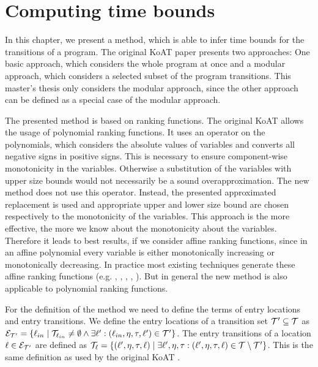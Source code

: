 \section{Computing time bounds}

In this chapter, we present a method, which is able to infer time bounds for the transitions of a program.
The original KoAT paper \cite{koat} presents two approaches: One basic approach, which considers the whole program at once and a modular approach, which considers a selected subset of the program transitions.
This master's thesis only considers the modular approach, since the other approach can be defined as a special case of the modular approach.

The presented method is based on ranking functions.
The original KoAT allows the usage of polynomial ranking functions.
It uses an operator on the polynomials, which considers the absolute values of variables and converts all negative signs in positive signs.
This is necessary to ensure component-wise monotonicity in the variables.
Otherwise a substitution of the variables with upper size bounds would not necessarily be a sound overapproximation.
The new method does not use this operator.
Instead, the presented approximated replacement is used and appropriate upper and lower size bound are chosen respectively to the monotonicity of the variables.
This approach is the more effective, the more we know about the monotonicity about the variables.
Therefore it leads to best results, if we consider affine ranking functions, since in an affine polynomial every variable is either monotonically increasing or monotonically decreasing.
In practice most existing techniques generate these affine ranking functions (e.g. \cite{podelski2004prf}, \cite{bradley2005linear}, \cite{bagnara2012new}, \cite{leike2014ranking}, \cite{ben2013linear}).
But in general the new method is also applicable to polynomial ranking functions.

For the definition of the method we need to define the terms of entry locations and entry transitions.
We define the entry locations of a transition set $\mathcal{T}' \subseteq \mathcal{T}$ as $\mathcal{E}_{\mathcal{T}'} = \lbrace \ell_{in} \mid \mathcal{T}_{\ell_{in}} \neq \emptyset \wedge \exists \ell': (\ell_{in}, \eta, \tau, \ell') \in \mathcal{T}' \rbrace$.
The entry transitions of a location $\ell \in \mathcal{E}_{\mathcal{T}'}$ are defined as $\mathcal{T}_{\ell} = \lbrace (\ell', \eta, \tau, \ell) \mid \exists \ell', \eta, \tau: (\ell', \eta, \tau, \ell) \in \mathcal{T} \setminus \mathcal{T}' \rbrace$.
This is the same definition as used by the original KoAT \cite{koat}.

